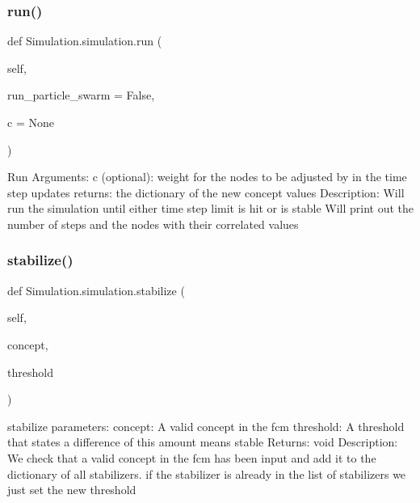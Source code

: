 \subsubsection{\texorpdfstring{run()}{run()}}
{\footnotesize\ttfamily def Simulation.\+simulation.\+run (\begin{DoxyParamCaption}\item[{}]{self,  }\item[{}]{run\+\_\+particle\+\_\+swarm = {\ttfamily False},  }\item[{}]{c = {\ttfamily None} }\end{DoxyParamCaption})}

\begin{DoxyVerb}Run
Arguments: c (optional): weight for the nodes to be adjusted by in the time step updates
returns: the dictionary of the new concept values
Description: Will run the simulation until either time step limit is hit or is stable
Will print out the number of steps and the nodes with their correlated values
\end{DoxyVerb}
 \hypertarget{class_simulation_1_1simulation_aba88676dbf04c07845b65cae2c85e536}{}\label{class_simulation_1_1simulation_aba88676dbf04c07845b65cae2c85e536} 
\subsubsection{\texorpdfstring{stabilize()}{stabilize()}}
{\footnotesize\ttfamily def Simulation.\+simulation.\+stabilize (\begin{DoxyParamCaption}\item[{}]{self,  }\item[{}]{concept,  }\item[{}]{threshold }\end{DoxyParamCaption})}

\begin{DoxyVerb}stabilize
parameters: concept: A valid concept in the fcm
threshold: A threshold that states a difference of this amount means stable
Returns: void
Description: We check that a valid concept in the fcm has been input and add it to the dictionary of all stabilizers.
if the stabilizer is already in the list of stabilizers we just set the new threshold
\end{DoxyVerb}
 \hypertarget{class_simulation_1_1simulation_ae4ffda917687b0cb3cd1582e15e7541d}{}\label{class_simulation_1_1simulation_ae4ffda917687b0cb3cd1582e15e7541d} 

